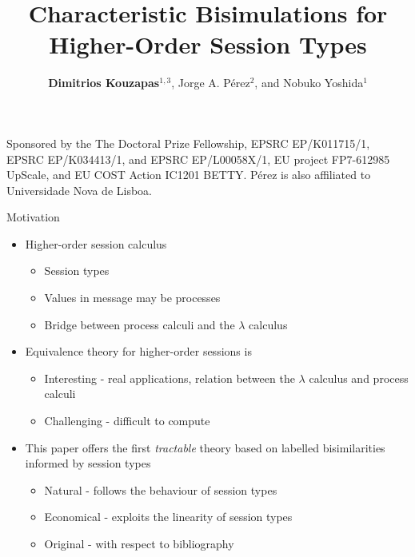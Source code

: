 \documentclass{beamer}
\title{Characteristic Bisimulations for Higher-Order Session Types}
\author{{\bf Dimitrios Kouzapas$^{1,3}$}, Jorge A. P\'{e}rez$^{2}$, and Nobuko Yoshida$^1$}
\institute{Imperial College London$^1$, University of Groningen$^2$, University of Glasgow$^3$}
\date
\begin{document}
	\begin{frame}
		\titlepage

		{ \tiny %
		Sponsored by the The Doctoral Prize Fellowship, EPSRC EP/K011715/1,
		EPSRC EP/K034413/1, and EPSRC EP/L00058X/1,
		EU project FP7-612985 UpScale, and EU COST Action IC1201 BETTY.  
		P\'{e}rez is  also affiliated to
		Universidade Nova de Lisboa.%
		}
	\end{frame}

	\begin{frame}{Motivation}
		\begin{itemize}
			\item	Higher-order session calculus

				\begin{itemize}
					\item	Session types
					\item	Values in message may be processes
					\item	Bridge between process calculi and the $\lambda$ calculus
				\end{itemize}


			\item	Equivalence theory for higher-order sessions is
				\begin{itemize}
					\item	Interesting - real applications, relation between the $\lambda$ calculus and process calculi
					\item	Challenging - difficult to compute
				\end{itemize}

			\item	This paper offers the first {\em tractable} theory based on labelled bisimilarities
				informed by session types %
				\begin{itemize}
					\item	Natural - follows the behaviour of session types
					\item	Economical - exploits the linearity of session types
					\item	Original - with respect to bibliography
				\end{itemize}
		\end{itemize}
	\end{frame}
\end{document}
